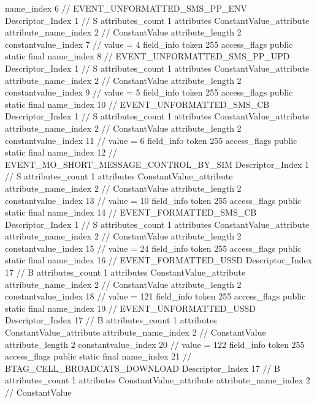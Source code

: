 {{{{{				name_index	6		// EVENT_UNFORMATTED_SMS_PP_ENV
				Descriptor_Index	1		// S
				attributes_count	1
				attributes {
				ConstantValue_attribute {
					attribute_name_index	2		// ConstantValue
					attribute_length	2
					constantvalue_index	7		// value = 4
				}
				}
			}
			field_info {
				token	255
				access_flags	public static final
				name_index	8		// EVENT_UNFORMATTED_SMS_PP_UPD
				Descriptor_Index	1		// S
				attributes_count	1
				attributes {
				ConstantValue_attribute {
					attribute_name_index	2		// ConstantValue
					attribute_length	2
					constantvalue_index	9		// value = 5
				}
				}
			}
			field_info {
				token	255
				access_flags	public static final
				name_index	10		// EVENT_UNFORMATTED_SMS_CB
				Descriptor_Index	1		// S
				attributes_count	1
				attributes {
				ConstantValue_attribute {
					attribute_name_index	2		// ConstantValue
					attribute_length	2
					constantvalue_index	11		// value = 6
				}
				}
			}
			field_info {
				token	255
				access_flags	public static final
				name_index	12		// EVENT_MO_SHORT_MESSAGE_CONTROL_BY_SIM
				Descriptor_Index	1		// S
				attributes_count	1
				attributes {
				ConstantValue_attribute {
					attribute_name_index	2		// ConstantValue
					attribute_length	2
					constantvalue_index	13		// value = 10
				}
				}
			}
			field_info {
				token	255
				access_flags	public static final
				name_index	14		// EVENT_FORMATTED_SMS_CB
				Descriptor_Index	1		// S
				attributes_count	1
				attributes {
				ConstantValue_attribute {
					attribute_name_index	2		// ConstantValue
					attribute_length	2
					constantvalue_index	15		// value = 24
				}
				}
			}
			field_info {
				token	255
				access_flags	public static final
				name_index	16		// EVENT_FORMATTED_USSD
				Descriptor_Index	17		// B
				attributes_count	1
				attributes {
				ConstantValue_attribute {
					attribute_name_index	2		// ConstantValue
					attribute_length	2
					constantvalue_index	18		// value = 121
				}
				}
			}
			field_info {
				token	255
				access_flags	public static final
				name_index	19		// EVENT_UNFORMATTED_USSD
				Descriptor_Index	17		// B
				attributes_count	1
				attributes {
				ConstantValue_attribute {
					attribute_name_index	2		// ConstantValue
					attribute_length	2
					constantvalue_index	20		// value = 122
				}
				}
			}
			field_info {
				token	255
				access_flags	public static final
				name_index	21		// BTAG_CELL_BROADCATS_DOWNLOAD
				Descriptor_Index	17		// B
				attributes_count	1
				attributes {
				ConstantValue_attribute {
					attribute_name_index	2		// ConstantValue
}}}}}}}

